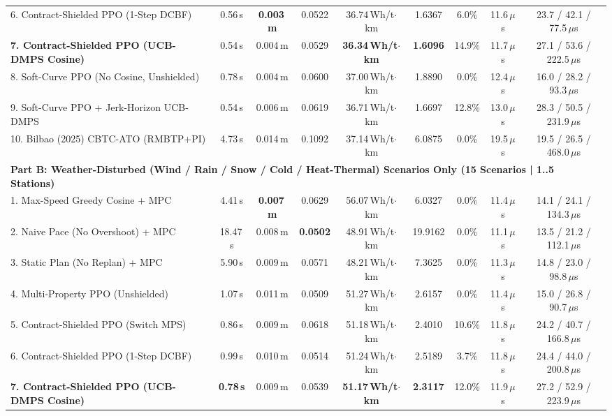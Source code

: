 \documentclass[10pt,a4paper]{article}
\begin{document}
\begin{table}[h!]
{\begin{tabular}{lcccccccc}
6. Contract-Shielded PPO (1-Step DCBF) & 0.56\,s & \textbf{0.003\,m} & 0.0522 & 36.74\,Wh/t$\cdot$km & 1.6367 & 6.0\% & 11.6\,$\mu$s & 23.7 / 42.1 / 77.5\,$\mu$s \\
\textbf{7. Contract-Shielded PPO (UCB-DMPS Cosine)} & 0.54\,s & 0.004\,m & 0.0529 & \textbf{36.34\,Wh/t$\cdot$km} & \textbf{1.6096} & 14.9\% & 11.7\,$\mu$s & 27.1 / 53.6 / 222.5\,$\mu$s \\
8. Soft-Curve PPO (No Cosine, Unshielded) & 0.78\,s & 0.004\,m & 0.0600 & 37.00\,Wh/t$\cdot$km & 1.8890 & 0.0\% & 12.4\,$\mu$s & 16.0 / 28.2 / 93.3\,$\mu$s \\
9. Soft-Curve PPO + Jerk-Horizon UCB-DMPS & 0.54\,s & 0.006\,m & 0.0619 & 36.71\,Wh/t$\cdot$km & 1.6697 & 12.8\% & 13.0\,$\mu$s & 28.3 / 50.5 / 231.9\,$\mu$s \\
10. Bilbao (2025) CBTC-ATO (RMBTP+PI) \cite{ref17} & 4.73\,s & 0.014\,m & 0.1092 & 37.14\,Wh/t$\cdot$km & 6.0875 & 0.0\% & 19.5\,$\mu$s & 19.5 / 26.5 / 468.0\,$\mu$s \\
\midrule
\multicolumn{9}{l}{\textbf{Part B: Weather-Disturbed (Wind / Rain / Snow / Cold / Heat-Thermal) Scenarios Only (15 Scenarios | 1..5 Stations)}} \\
\midrule
1. Max-Speed Greedy Cosine + MPC & 4.41\,s & \textbf{0.007\,m} & 0.0629 & 56.07\,Wh/t$\cdot$km & 6.0327 & 0.0\% & 11.4\,$\mu$s & 14.1 / 24.1 / 134.3\,$\mu$s \\
2. Naive Pace (No Overshoot) + MPC & 18.47\,s & 0.008\,m & \textbf{0.0502} & 48.91\,Wh/t$\cdot$km & 19.9162 & 0.0\% & 11.1\,$\mu$s & 13.5 / 21.2 / 112.1\,$\mu$s \\
3. Static Plan (No Replan) + MPC & 5.90\,s & 0.009\,m & 0.0571 & 48.21\,Wh/t$\cdot$km & 7.3625 & 0.0\% & 11.3\,$\mu$s & 14.8 / 23.0 / 98.8\,$\mu$s \\
4. Multi-Property PPO (Unshielded) & 1.07\,s & 0.011\,m & 0.0509 & 51.27\,Wh/t$\cdot$km & 2.6157 & 0.0\% & 11.4\,$\mu$s & 15.0 / 26.8 / 90.7\,$\mu$s \\
5. Contract-Shielded PPO (Switch MPS) & 0.86\,s & 0.009\,m & 0.0618 & 51.18\,Wh/t$\cdot$km & 2.4010 & 10.6\% & 11.8\,$\mu$s & 24.2 / 40.7 / 166.8\,$\mu$s \\
6. Contract-Shielded PPO (1-Step DCBF) & 0.99\,s & 0.010\,m & 0.0514 & 51.24\,Wh/t$\cdot$km & 2.5189 & 3.7\% & 11.8\,$\mu$s & 24.4 / 44.0 / 200.8\,$\mu$s \\
\textbf{7. Contract-Shielded PPO (UCB-DMPS Cosine)} & \textbf{0.78\,s} & 0.009\,m & 0.0539 & \textbf{51.17\,Wh/t$\cdot$km} & \textbf{2.3117} & 12.0\% & 11.9\,$\mu$s & 27.2 / 52.9 / 223.9\,$\mu$s \\

\end{tabular}}
\end{table}
\end{document}
